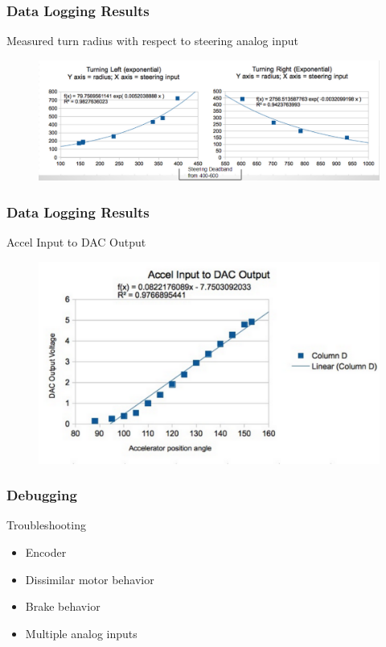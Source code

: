 \documentclass{beamer}
\begin{document}
\begin{frame}
	\frametitle{Data Logging Results}
		\begin{block}{Measured turn radius with respect to steering analog input}
			\begin{figure}
			    \centering
				\includegraphics[scale=.45]{figures/result1.pdf}
			\end{figure}
		\end{block}
\end{frame}
\begin{frame}
	\frametitle{Data Logging Results}
		\begin{block}{Accel Input to DAC Output}
			\begin{figure}
			    \centering
				\includegraphics[scale=.5]{figures/result2.pdf}
			\end{figure}
		\end{block}
\end{frame}
\begin{frame}
	\frametitle{Debugging}
		\begin{block}{Troubleshooting}
			\begin{itemize}
				\item Encoder
				\item Dissimilar motor behavior
				\item Brake behavior
				\item Multiple analog inputs
			\end{itemize}
		\end{block}
\end{frame}
\end{document}
